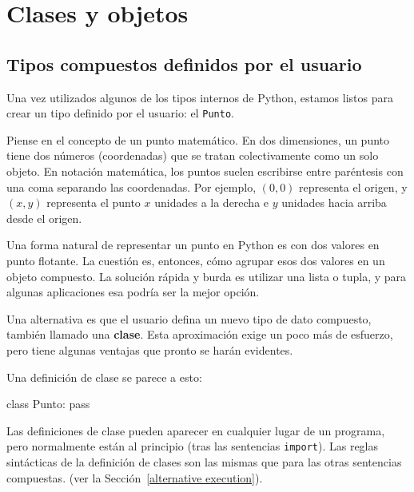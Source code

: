 
\chapter{Clases y objetos}

 

\section{Tipos compuestos definidos por el usuario}

\label{point}  
 

Una vez utilizados algunos de los tipos internos de Python, estamos
listos para crear un tipo definido por el usuario: el \texttt{Punto}.

Piense en el concepto de un punto matemático. En dos dimensiones,
un punto tiene dos números (coordenadas) que se tratan colectivamente
como un solo objeto. En notación matemática, los puntos suelen escribirse
entre paréntesis con una coma separando las coordenadas. Por ejemplo,
$(0,0)$ representa el origen, y $(x,y)$ representa el punto $x$
unidades a la derecha e $y$ unidades hacia arriba desde el origen.

Una forma natural de representar un punto en Python es con dos valores
en punto flotante. La cuestión es, entonces, cómo agrupar esos dos
valores en un objeto compuesto. La solución rápida y burda es utilizar
una lista o tupla, y para algunas aplicaciones esa podría ser la mejor
opción.


Una alternativa es que el usuario defina un nuevo tipo de dato compuesto,
también llamado una \textbf{clase}. Esta aproximación exige un poco
más de esfuerzo, pero tiene algunas ventajas que pronto se harán evidentes.

Una definición de clase se parece a esto:
\begin{pythoncode}
class Punto:
  pass
\end{pythoncode}

Las definiciones de clase pueden aparecer en cualquier lugar de un
programa, pero normalmente están al principio (tras las sentencias
\texttt{import}). Las reglas sintácticas de la definición de clases
son las mismas que para las otras sentencias compuestas. (ver la Sección~\ref{alternative execution}).

